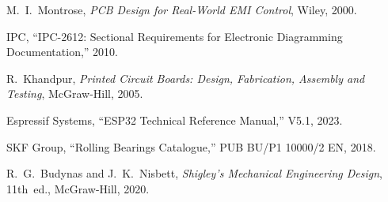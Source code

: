\documentclass[11pt,letterpaper,twoside,openany]{book}
\begin{document}
\begin{enumerate}[label={[\arabic*]},leftmargin=2em]
\item M.~I.~Montrose, \emph{PCB Design for Real-World EMI Control}, Wiley, 2000.
\item IPC, ``IPC-2612: Sectional Requirements for Electronic Diagramming Documentation,'' 2010. \label{ipc2612}
\item R.~Khandpur, \emph{Printed Circuit Boards: Design, Fabrication, Assembly and Testing}, McGraw-Hill, 2005.
\item Espressif Systems, ``ESP32 Technical Reference Manual,'' V5.1, 2023.
\item SKF Group, ``Rolling Bearings Catalogue,'' PUB BU/P1 10000/2 EN, 2018.
\item R.~G.~Budynas and J.~K.~Nisbett, \emph{Shigley's Mechanical Engineering Design}, 11th~ed., McGraw-Hill, 2020.
\end{enumerate}
\end{document}
